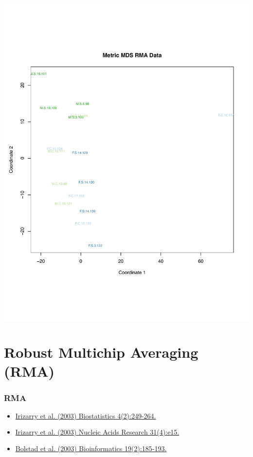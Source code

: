 \documentclass[pdf]{beamer}
\begin{document}
\begin{frame}
\begin{center}
\includegraphics[scale=0.3]{figures/normMDS.pdf} 
\end{center}
\end{frame}

\section{Robust Multichip Averaging (RMA)}

\begin{frame}
  \frametitle{RMA}
  \begin{itemize}
  \item \href{http://biostatistics.oxfordjournals.org/content/4/2/249.abstract}{Irizarry et al. (2003) Biostatistics 4(2):249-264.}
  \item \href{http://nar.oxfordjournals.org/content/31/4/e15.abstract}{Irizarry et al. (2003) Nucleic Acids Research 31(4):e15.}
  \item \href{http://bioinformatics.oxfordjournals.org/content/19/2/185.abstract}{Bolstad et al. (2003) Bioinformatics 19(2):185-193.}
  \end{itemize}
\end{frame}
\end{document}

